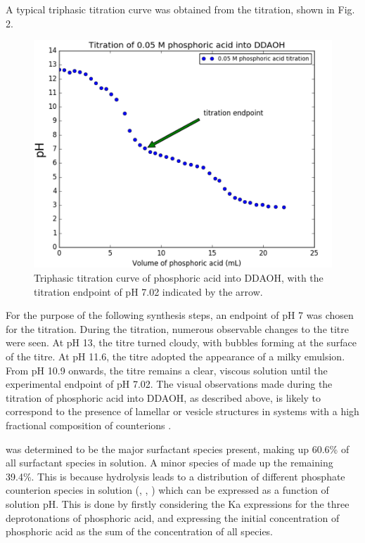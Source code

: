 \documentclass[a4paper,12pt,twocolumn]{article}
\begin{document}
  	A typical triphasic titration curve was obtained from the titration, shown in Fig. 2. 
  	
  	\begin{figure}[b!]
		\includegraphics[width=\linewidth]{titration.png}
  		\caption{Triphasic titration curve of phosphoric acid into DDAOH, with the titration endpoint of pH 7.02 indicated by the arrow.}
  	\end{figure}
  	
  	For the purpose of the following synthesis steps, an endpoint of pH 7 was chosen for the titration. During the titration, numerous observable changes to the titre were seen. At pH 13, the titre turned cloudy, with bubbles forming at the surface of the titre. At pH 11.6, the titre adopted the appearance of a milky emulsion. From pH 10.9 onwards, the titre remains a clear, viscous solution until the experimental endpoint of pH 7.02. The visual observations made during the titration of phosphoric acid into DDAOH, as described above, is likely to correspond to the presence of lamellar or vesicle structures in  systems with a high fractional composition of  counterions \cite{liu2014}. 
  	
  	
  	 was determined to be the major surfactant species present, making up 60.6\% of all surfactant species in solution. A minor species of  made up the remaining 39.4\%. This is because hydrolysis leads to a distribution of different phosphate counterion species in solution (, , ) which can be expressed as a function of solution pH. This is done by firstly considering the Ka expressions for the three deprotonations of phosphoric acid, and expressing the initial concentration of phosphoric acid as the sum of the concentration of all species. 
  	
\end{document}
